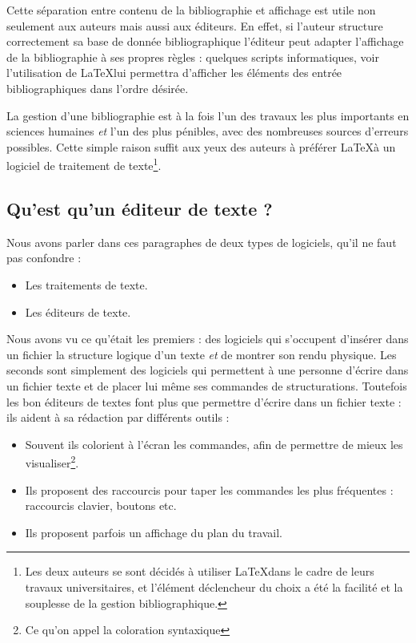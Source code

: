 Cette séparation entre contenu de la bibliographie et affichage est utile non seulement aux auteurs mais aussi aux éditeurs. En effet, si l'auteur structure correctement sa base de donnée bibliographique l'éditeur peut adapter l'affichage de la bibliographie à ses propres règles : quelques scripts informatiques, voir l'utilisation de \LaTeX lui permettra d'afficher les éléments des entrée bibliographiques dans l'ordre désirée.

La gestion d'une bibliographie est à la fois l'un des travaux les plus importants en sciences humaines \emph{et} l'un des plus pénibles, avec des nombreuses sources d'erreurs possibles. Cette simple raison suffit aux yeux des auteurs à préférer \LaTeX à un logiciel de traitement de texte\footnote{Les deux auteurs se sont décidés à utiliser \LaTeX dans le cadre de leurs travaux universitaires, et l'élément déclencheur du choix a été la facilité et la souplesse de la gestion bibliographique.}.

\subsection{Qu'est qu'un éditeur de texte ?}

Nous avons parler dans ces paragraphes de deux types de logiciels, qu'il ne faut pas confondre :
\begin{itemize}
	\item Les traitements de texte.
	\item Les éditeurs de texte.
\end{itemize}

Nous avons vu ce qu'était les premiers : des logiciels qui s'occupent d'insérer dans un fichier la structure logique d'un texte \emph{et} de montrer son rendu physique.
Les seconds sont simplement des logiciels qui permettent à une personne d'écrire dans un fichier texte et de placer lui même ses commandes de structurations.
Toutefois les bon éditeurs de textes font plus que permettre d'écrire dans un fichier texte : ils aident à sa rédaction par différents outils :
\begin{itemize}
\item Souvent ils colorient à l'écran les commandes, afin de permettre de mieux les visualiser\footnote{Ce qu'on appel la coloration syntaxique}.
\item Ils proposent des raccourcis pour taper les commandes les plus fréquentes :  raccourcis clavier, boutons etc.
\item Ils proposent parfois un affichage du plan du travail.
\end{itemize}

